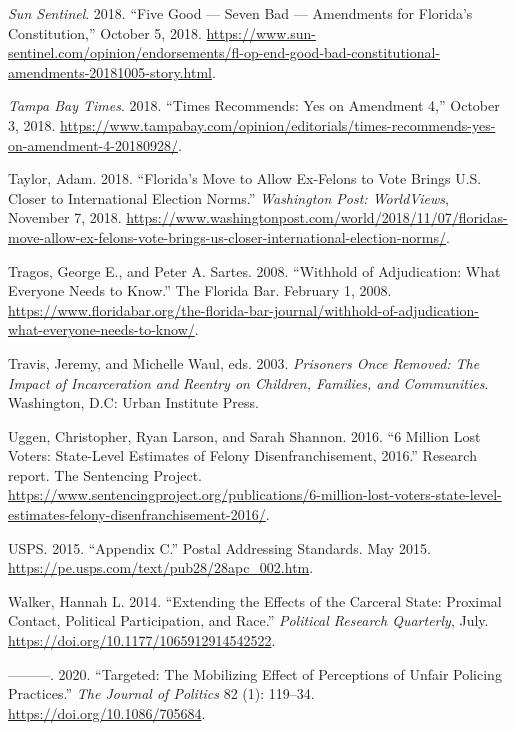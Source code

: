 \documentclass[
  12pt,
]{article}
\newlength{\cslhangindent}
\newenvironment{cslreferences}%
  {\setlength{\parindent}{0pt}%
  \everypar{\setlength{\hangindent}{\cslhangindent}}\ignorespaces}%
  {\par}
\begin{document}
\begin{cslreferences}
\leavevmode\hypertarget{ref-SunSentinelEditorial2018}{}%
\emph{Sun Sentinel}. 2018. ``Five Good --- Seven Bad --- Amendments for Florida's Constitution,'' October 5, 2018. \url{https://www.sun-sentinel.com/opinion/endorsements/fl-op-end-good-bad-constitutional-amendments-20181005-story.html}.

\leavevmode\hypertarget{ref-tampabaytimes2018}{}%
\emph{Tampa Bay Times}. 2018. ``Times Recommends: Yes on Amendment 4,'' October 3, 2018. \url{https://www.tampabay.com/opinion/editorials/times-recommends-yes-on-amendment-4-20180928/}.

\leavevmode\hypertarget{ref-Taylor2018}{}%
Taylor, Adam. 2018. ``Florida's Move to Allow Ex-Felons to Vote Brings U.S. Closer to International Election Norms.'' \emph{Washington Post: WorldViews}, November 7, 2018. \url{https://www.washingtonpost.com/world/2018/11/07/floridas-move-allow-ex-felons-vote-brings-us-closer-international-election-norms/}.

\leavevmode\hypertarget{ref-Tragos2008}{}%
Tragos, George E., and Peter A. Sartes. 2008. ``Withhold of Adjudication: What Everyone Needs to Know.'' The Florida Bar. February 1, 2008. \url{https://www.floridabar.org/the-florida-bar-journal/withhold-of-adjudication-what-everyone-needs-to-know/}.

\leavevmode\hypertarget{ref-Travis2003}{}%
Travis, Jeremy, and Michelle Waul, eds. 2003. \emph{Prisoners Once Removed: The Impact of Incarceration and Reentry on Children, Families, and Communities}. Washington, D.C: Urban Institute Press.

\leavevmode\hypertarget{ref-sentencing_2016}{}%
Uggen, Christopher, Ryan Larson, and Sarah Shannon. 2016. ``6 Million Lost Voters: State-Level Estimates of Felony Disenfranchisement, 2016.'' Research report. The Sentencing Project. \url{https://www.sentencingproject.org/publications/6-million-lost-voters-state-level-estimates-felony-disenfranchisement-2016/}.

\leavevmode\hypertarget{ref-USPS2015}{}%
USPS. 2015. ``Appendix C.'' Postal Addressing Standards. May 2015. \url{https://pe.usps.com/text/pub28/28apc_002.htm}.

\leavevmode\hypertarget{ref-Walker2014}{}%
Walker, Hannah L. 2014. ``Extending the Effects of the Carceral State: Proximal Contact, Political Participation, and Race.'' \emph{Political Research Quarterly}, July. \url{https://doi.org/10.1177/1065912914542522}.

\leavevmode\hypertarget{ref-Walker2020}{}%
---------. 2020. ``Targeted: The Mobilizing Effect of Perceptions of Unfair Policing Practices.'' \emph{The Journal of Politics} 82 (1): 119--34. \url{https://doi.org/10.1086/705684}.


\end{cslreferences}
\end{document}
